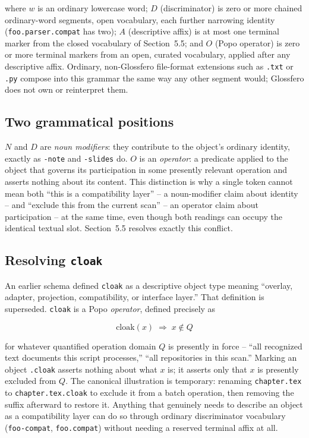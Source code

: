 \documentclass[11pt]{article}
\begin{document}
where $w$ is an ordinary lowercase word; $D$ (discriminator) is zero or more chained ordinary-word segments, open vocabulary, each further narrowing identity (\texttt{foo.parser.compat} has two); $A$ (descriptive affix) is at most one terminal marker from the closed vocabulary of Section~5.5; and $O$ (Popo operator) is zero or more terminal markers from an open, curated vocabulary, applied after any descriptive affix. Ordinary, non-Glossfero file-format extensions such as \texttt{.txt} or \texttt{.py} compose into this grammar the same way any other segment would; Glossfero does not own or reinterpret them.

\subsection{Two grammatical positions}

$N$ and $D$ are \emph{noun modifiers}: they contribute to the object's ordinary identity, exactly as \texttt{-note} and \texttt{-slides} do. $O$ is an \emph{operator}: a predicate applied to the object that governs its participation in some presently relevant operation and asserts nothing about its content. This distinction is why a single token cannot mean both ``this is a compatibility layer'' -- a noun-modifier claim about identity -- and ``exclude this from the current scan'' -- an operator claim about participation -- at the same time, even though both readings can occupy the identical textual slot. Section~5.5 resolves exactly this conflict.

\subsection{Resolving \texttt{cloak}}

An earlier schema defined \texttt{cloak} as a descriptive object type meaning ``overlay, adapter, projection, compatibility, or interface layer.'' That definition is superseded. \texttt{cloak} is a Popo \emph{operator}, defined precisely as

\begin{equation}
\mathrm{cloak}(x) \;\Rightarrow\; x \notin Q
\end{equation}

for whatever quantified operation domain $Q$ is presently in force -- ``all recognized text documents this script processes,'' ``all repositories in this scan.'' Marking an object \texttt{.cloak} asserts nothing about what $x$ is; it asserts only that $x$ is presently excluded from $Q$. The canonical illustration is temporary: renaming \texttt{chapter.tex} to \texttt{chapter.tex.cloak} to exclude it from a batch operation, then removing the suffix afterward to restore it. Anything that genuinely needs to describe an object as a compatibility layer can do so through ordinary discriminator vocabulary (\texttt{foo-compat}, \texttt{foo.compat}) without needing a reserved terminal affix at all.
\end{document}

